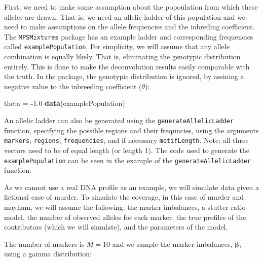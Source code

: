 \documentclass[]{article}
\newenvironment{Shaded}{\begin{snugshade}}{\end{snugshade}}
\newcommand{\KeywordTok}[1]{\textcolor[rgb]{0.13,0.29,0.53}{\textbf{#1}}}
\newcommand{\DataTypeTok}[1]{\textcolor[rgb]{0.13,0.29,0.53}{#1}}
\newcommand{\DecValTok}[1]{\textcolor[rgb]{0.00,0.00,0.81}{#1}}
\newcommand{\FloatTok}[1]{\textcolor[rgb]{0.00,0.00,0.81}{#1}}
\newcommand{\StringTok}[1]{\textcolor[rgb]{0.31,0.60,0.02}{#1}}
\newcommand{\OperatorTok}[1]{\textcolor[rgb]{0.81,0.36,0.00}{\textbf{#1}}}
\newcommand{\NormalTok}[1]{#1}
\newcommand{\bs}[1]{\ensuremath{\boldsymbol{#1}}}
\begin{document}
First, we need to make some assumption about the popoulation from which
these alleles are drawn. That is, we need an allelic ladder of this
population and we need to make assumptions on the allele frequencies and
the inbreding coefficient. The \texttt{MPSMixtures} package has an
example ladder and corresponding frequencies called
\texttt{examplePopulation}. For simplicity, we will assume that any
allele combination is equally likely. That is, eliminating the genotypic
distribution entirely. This is done to make the deconvolution results
easily comparable with the truth. In the package, the genotypic
distribution is ignored, by assining a negative value to the inbreeding
coefficient (\(\theta\)):

\begin{Shaded}
\begin{Highlighting}[]
\NormalTok{theta =}\StringTok{ }\OperatorTok{-}\FloatTok{1.0}
\KeywordTok{data}\NormalTok{(examplePopulation)}
\end{Highlighting}
\end{Shaded}

An allelic ladder can also be generated using the
\texttt{generateAllelicLadder} function, specifying the possible regions
and their frequncies, using the arguments \texttt{markers},
\texttt{regions}, \texttt{frequencies}, and if necessary
\texttt{motifLength}. Note: all three vectors need to be of equal length
(or length 1). The code used to generate the \texttt{examplePopulation}
can be seen in the example of the \texttt{generateAllelicLadder}
function.

As we cannot use a real DNA profile as an example, we will simulate data
given a fictional case of murder. To simulate the coverage, in this case
of murder and mayham, we will assume the following: the marker
imbalances, a stutter ratio model, the number of observed alleles for
each marker, the true profiles of the contributors (which we will
simulate), and the parameters of the model.

The number of markers is \(M = 10\) and we sample the marker imbalances,
\(\bs\beta\), using a gamma distribution:

\begin{Shaded}
\end{Shaded}
\end{document}
